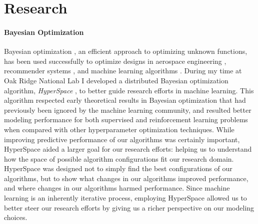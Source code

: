 \section*{Research}
\paragraph{Bayesian Optimization}
Bayesian optimization \cite{Mockus:1974}, an efficient approach to optimizing unknown functions, has been used successfully to optimize designs in aerospace engineering \cite{Lam:Aero}, recommender systems \cite{Li:2010:NewsBandits, ChapelleL11:News, VanchinathanNBK14:recommender}, and machine learning algorithms \cite{bergstra2011algorithms, gelbart2014}. During my time at Oak Ridge National Lab I developed a distributed Bayesian optimization algorithm, \textit{HyperSpace} \cite{Young2018Hyperspace}, to better guide research efforts in machine learning. This algorithm respected early theoretical results in Bayesian optimization that had previously been ignored by the machine learning community, and resulted better modeling performance for both supervised and reinforcement learning problems when compared with other hyperparameter optimization techniques. While improving predictive performance of our algorithms was certainly important, HyperSpace aided a larger goal for our research efforts: helping us to understand how the space of possible algorithm configurations fit our research domain. HyperSpace was designed not to simply find the best configurations of our algorithms, but to show what changes in our algorithms improved performance, and where changes in our algorithms harmed performance. Since machine learning is an inherently iterative process, employing HyperSpace allowed us to better steer our research efforts by giving us a richer perspective on our modeling choices. 

